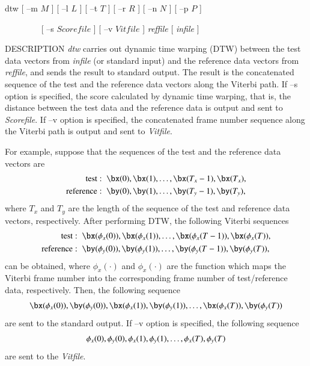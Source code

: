 \hypertarget{dtw}{}
\begin{synopsis}
\item[dtw] [ --m $M$ ]  [ --l $L$ ]  [ --t $T$ ]  [ --r $R$ ]
           [ --n $N$ ]  [ --p $P$ ]
 \item [\ ~~~~~~~] [ --s $Scorefile$ ]  [ --v $Vitfile$ ]
 {\em reffile} [ {\em infile} ]
\end{synopsis}

\begin{qsection}{DESCRIPTION}
 {\em dtw} carries out dynamic time warping (DTW) between
 the test data vectors from {\em infile} (or standard input)
 and the reference data vectors from {\em reffile},
 and sends the result to standard output.
 The result is the concatenated sequence
 of the test and the reference data vectors
 along the Viterbi path.
 If --s option is specified,
 the score calculated by dynamic time warping,
 that is, the distance between the test data and the reference data
 is output and sent to {\em Scorefile}.
 If --v option is specified,
 the concatenated frame number sequence
 along the Viterbi path
 is output and sent to {\em Vitfile}.

 For example, suppose that the sequences of the test and the reference data vectors are
 \begin{align}
  \mathrm{test} :\;\; & \bx(0), \bx(1), \dots, \bx(T_x - 1), \bx(T_x), \notag \\
  \mathrm{reference}  :\;\; & \by(0), \by(1), \dots, \by(T_y - 1), \by(T_y), \notag
 \end{align}
 where $T_x$ and $T_y$ are the length of the sequence of the test and reference data
 vectors, respectively. After performing DTW, the following Viterbi sequences
 \begin{align}
  \mathrm{test} :\;\; & \bx(\phi_x(0)), \bx(\phi_x(1)), \dots, \bx(\phi_x(T - 1)),
  \bx(\phi_{x}(T)), \notag \\
  \mathrm{reference}  :\;\; & \by(\phi_y(0)), \by(\phi_y(1)), \dots,
  \by(\phi_y(T - 1)), \by(\phi_y(T)), \notag
 \end{align}
 can be obtained, where $\phi_x(\cdot)$ and $\phi_x(\cdot)$ are the function which
 maps the Viterbi frame number into the corresponding frame number of test/reference
 data, respectively.  Then, the following sequence
 \begin{align}
  \bx(\phi_x(0)), \by(\phi_y(0)),
  \bx(\phi_x(1)), \by(\phi_y(1)),
  \dots, \bx(\phi_{x}(T)), \by(\phi_y(T)) \notag
 \end{align}
 are sent to the standard output.
 If --v option is specified, the following sequence
 \begin{align}
  \phi_x(0), \phi_y(0),
  \phi_x(1), \phi_y(1),
  \dots, \phi_{x}(T), \phi_y(T) \notag
 \end{align}
 are sent to the {\em Vitfile}.


\end{qsection}
